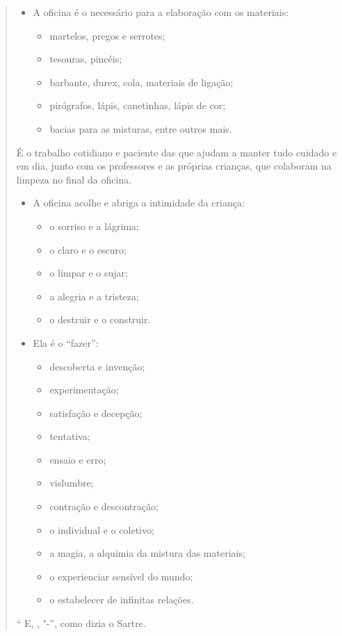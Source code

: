 \begin{quote}
\begin{itemize}
\item
  A oficina é o  necessário para a elaboração com os
  materiais:
  \begin{itemize}
  \item
    martelos, pregos e serrotes;
  \item
    tesouras, pincéis;
  \item
    barbante, durex, cola, materiais de ligação;
  \item
    pirógrafos, lápis, canetinhas, lápis de cor;
  \item
    bacias para as misturas, entre outros mais.
  \end{itemize}
\end{itemize}
É o trabalho cotidiano e paciente das  que ajudam a manter tudo
cuidado e em dia, junto com os professores e as próprias crianças, que
colaboram na limpeza no final da oficina.

\begin{itemize}
\item
  A oficina acolhe e abriga a intimidade da criança:
  \begin{itemize}
  \item
    o sorriso e a lágrima;
  \item
    o claro e o escuro;
  \item
    o limpar e o sujar;
  \item
    a alegria e a tristeza;
  \item
    o destruir e o construir.
  \end{itemize}
\item
  Ela é o ``fazer'':
  \begin{itemize}
  \item
    descoberta e invenção;
  \item
    experimentação;
  \item
    satisfação e decepção;
  \item
    tentativa;
  \item
    ensaio e erro;
  \item
    vislumbre;
  \item
    contração e descontração;
  \item
    o individual e o coletivo;
  \item
    a magia, a alquimia da mistura das materiais;
  \item
    o experienciar sensível do mundo;
  \item
    o estabelecer de infinitas relações.
  \end{itemize}
\end{itemize}
`` E,  , "-'', como dizia o Sartre.

\end{quote}
